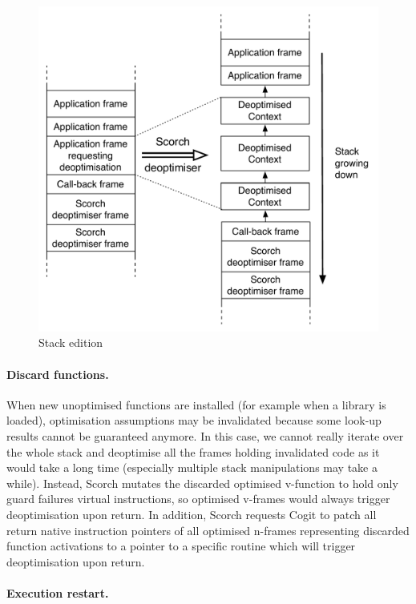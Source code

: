 \documentclass[a4paper,12pt,twoside]{../includes/ThesisStyle}
\begin{document}
\begin{figure}[h!]
    \begin{center}
		\includegraphics[width=0.80\linewidth]{DeoptStacks}
        \caption{Stack edition}
        \label{fig:DeoptStacks}
    \end{center}
\end{figure}

\paragraph{Discard functions.} When new unoptimised functions are installed (for example when a library is loaded), optimisation assumptions may be invalidated because some look-up results cannot be guaranteed anymore. In this case, we cannot really iterate over the whole stack and deoptimise all the frames holding invalidated code as it would take a long time (especially multiple stack manipulations may take a while). Instead, Scorch mutates the discarded optimised v-function to hold only guard failures virtual instructions, so optimised v-frames would always trigger deoptimisation upon return. In addition, Scorch requests Cogit to patch all return native instruction pointers of all optimised n-frames representing discarded function activations to a pointer to a specific routine which will trigger deoptimisation upon return.

\paragraph{Execution restart.}
\end{document}
